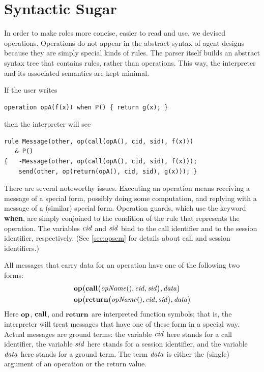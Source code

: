 \documentclass[a4paper,12pt,oneside,fleqn]{book} %
\begin{document}
{\section{Syntactic Sugar}\label{sec:sugar} %

In order to make roles more concise, easier to read and use, we devised
operations. Operations do not appear in the abstract syntax of agent
designs because they are simply special kinds of rules. The parser itself
builds an abstract syntax tree that contains rules, rather than operations.
This way, the interpreter and its associated semantics are kept minimal.

\begin{example}
If the user writes
\begin{verbatim}
operation opA(f(x)) when P() { return g(x); }
\end{verbatim}
then the interpreter will see
\begin{verbatim}
rule Message(other, op(call(opA(), cid, sid), f(x)))
   & P()
{   -Message(other, op(call(opA(), cid, sid), f(x)));
    send(other, op(return(opA(), cid, sid), g(x))); }
\end{verbatim}
There are several noteworthy issues. Executing an operation means receiving
a message of a special form, possibly doing some computation, and replying
with a message of a (similar) special form. Operation guards, which use the
keyword {\bf when}, are simply conjoined to the condition of the rule that
represents the operation. The variables ${\it cid}$ and ${\it sid}$ bind to
the call identifier and to the session identifier, respectively. (See
\autoref{sec:opsem} for details about call and session identifiers.)
\end{example}

All messages that carry data for an operation have one of the following two
forms:
\begin{align}
  &{\bf op}\bigl(
    {\bf call}\bigl({\it opName}(), {\it cid}, {\it sid}\bigr),
    {\it data}
  \bigr)
\\
  &{\bf op}\bigl(
    {\bf return}\bigl({\it opName}(), {\it cid}, {\it sid}\bigr),
    {\it data}
  \bigr)
\end{align}
Here ${\bf op}$, $\bf call$, and $\bf return$ are interpreted function
symbols; that is, the interpreter will treat messages that have one of
these form in a special way. Actual messages are ground terms: the variable
$\it cid$ here stands for a call identifier, the variable $\it sid$ here
stands for a session identifier, and the variable $\it data$ here stands
for a ground term. The term $\it data$ is either the (single) argument of
an operation or the return value.

}
\end{document}
